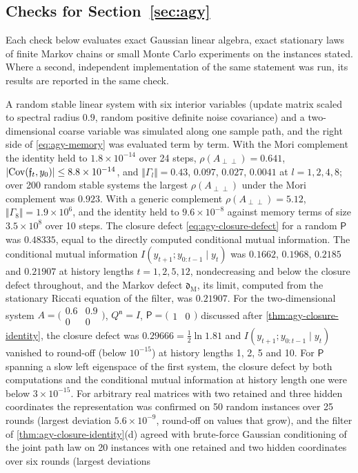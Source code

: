 \subsection{Checks for \texorpdfstring{Section~\ref{sec:agy}}{closure, agency and interaction}}\label{chk:agy}

Each check below evaluates exact Gaussian linear algebra, exact stationary laws of finite Markov chains or small Monte Carlo experiments on the instances stated. Where a second, independent implementation of the same statement was run, its results are reported in the same check.

\begin{numcheck}\label{chk:agy-mori-zwanzig}
A random stable linear system with six interior variables (update matrix scaled to spectral radius $0.9$, random positive definite noise covariance) and a two-dimensional coarse variable was simulated along one sample path, and the right side of \eqref{eq:agy-memory} was evaluated term by term. With the Mori complement the identity held to $1.8\times10^{-14}$ over 24 steps, $\rho(A_{\perp\perp})=0.641$, $\lvert\operatorname{Cov}(\mathfrak f_t,y_0)\rvert\le8.8\times10^{-14}$, and $\Vert\Gamma_l\Vert=0.43$, $0.097$, $0.027$, $0.0041$ at $l=1,2,4,8$; over 200 random stable systems the largest $\rho(A_{\perp\perp})$ under the Mori complement was $0.923$. With a generic complement $\rho(A_{\perp\perp})=5.12$, $\Vert\Gamma_8\Vert=1.9\times10^6$, and the identity held to $9.6\times10^{-8}$ against memory terms of size $3.5\times10^8$ over 10 steps. The closure defect \eqref{eq:agy-closure-defect} for a random $\mathsf P$ was $0.48335$, equal to the directly computed conditional mutual information. The conditional mutual information $I(y_{t+1};y_{0:t-1}\mid y_t)$ was $0.1662$, $0.1968$, $0.2185$ and $0.21907$ at history lengths $t=1,2,5,12$, nondecreasing and below the closure defect throughout, and the Markov defect $\mathfrak d_{\mathrm M}$, its limit, computed from the stationary Riccati equation of the filter, was $0.21907$. For the two-dimensional system $A=\bigl(\begin{smallmatrix}0.6&0.9\\0&0\end{smallmatrix}\bigr)$, $Q^{\mathfrak n}=I$, $\mathsf P=\bigl(\begin{smallmatrix}1&0\end{smallmatrix}\bigr)$ discussed after \cref{thm:agy-closure-identity}, the closure defect was $0.29666=\frac12\ln1.81$ and $I(y_{t+1};y_{0:t-1}\mid y_t)$ vanished to round-off (below $10^{-15}$) at history lengths 1, 2, 5 and 10. For $\mathsf P$ spanning a slow left eigenspace of the first system, the closure defect by both computations and the conditional mutual information at history length one were below $3\times10^{-15}$. For arbitrary real matrices with two retained and three hidden coordinates the representation was confirmed on 50 random instances over 25 rounds (largest deviation $5.6\times10^{-9}$, round-off on values that grow), and the filter of \cref{thm:agy-closure-identity}(d) agreed with brute-force Gaussian conditioning of the joint path law on 20 instances with one retained and two hidden coordinates over six rounds (largest deviations 
\end{numcheck}
